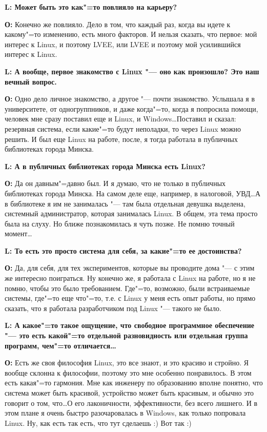 \documentclass[10pt, a5paper]{article}
\begin{document}
{\noindent \bf L: Может быть это как"=то повлияло на карьеру?}

{\noindent \bf О:} Конечно же повлияло. Дело в том, что каждый раз, когда вы идете к какому"=то изменению, есть много факторов. И нельзя сказать, что первое: мой интерес к Linux, и поэтому LVEE,  или LVEE и поэтому мой усилившийся интерес к Linux.

{\noindent \bf L: А вообще, первое знакомство с Linux "--- оно как произошло? Это наш вечный вопрос.}

{\noindent \bf О:} Одно дело личное знакомство, а другое "--- почти знакомство. Услышала я в университете, от одногруппников, и даже когда"=то, когда я попросила помощи, человек мне сразу поставил еще и Linux, и Windows\ldots Поставил и сказал: резервная система, если какие"=то будут неполадки, то через Linux можно решить. И был еще Linux на работе, после, я тогда работала в публичных библиотеках города Минска.

{\noindent \bf L: А в публичных библиотеках города Минска есть Linux?}

{\noindent \bf О:} Да он давным"=давно был. И я думаю, что не только в публичных библиотеках города Минска. На самом деле еще, например, в налоговой, УВД\ldots А в библиотеке я им не занималась "--- там была отдельная девушка выделена, системный администратор, которая занималась Linux. В общем, эта тема просто была на слуху. Но ближе познакомилась я чуть позже. Не помню точный момент\ldots

{\noindent \bf L: То есть это просто система для себя, за какие"=то ее достоинства?}


{\noindent \bf О:} Да, для себя, для тех экспериментов, которые вы проводите дома "--- с этим же интересно поиграться. Ну конечно же, я работала с Linux на работе, но я не помню, чтобы это было требованием. Где"=то, возможно, были встраиваемые системы, где"=то еще что"=то, т.е. с Linux у меня есть опыт работы, но прямо сказать, что я работала разработчиком под Linux "--- такого не было. 

{\noindent \bf L: А какое"=то такое ощущение, что свободное программное обеспечение "--- это есть какой"=то отдельной разновидность или отдельная группа программ, чем"=то отличается\ldots}

{\noindent \bf О:} Есть же своя философия Linux, это все знают, и это красиво и стройно. Я вообще склонна к философии, поэтому это мне особенно понравилось. В этом есть какая"=то гармония. Мне как инженеру по образованию вполне понятно, что система может быть красивой, устройство может быть красивым, и обычно это говорит о том, что\ldots О его лаконичности, эффективности, без всего лишнего. И в этом плане я очень быстро разочаровалась в Windows, как только попровала Linux. Ну, как есть так есть, что тут сделаешь :) Вот так :)
\end{document}
